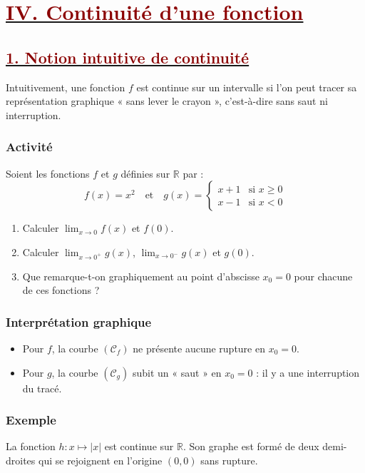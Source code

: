 \documentclass[12pt,a4paper]{article}
\begin{document}
\section*{\underline{\textcolor{darkred}{ IV. Continuité d'une fonction }}}
\subsection*{\underline{\textcolor{darkred}{ 1. Notion intuitive de continuité }}}

Intuitivement, une fonction $f$ est continue sur un intervalle si l'on peut tracer sa représentation graphique « sans lever le crayon », c'est-à-dire sans saut ni interruption.

\subsubsection*{Activité}
Soient les fonctions $f$ et $g$ définies sur $\mathbb{R}$ par :
\[
f(x) = x^2 \quad \text{et} \quad g(x) = \begin{cases} x + 1 & \text{si } x \ge 0 \\ x - 1 & \text{si } x < 0 \end{cases}
\]
\begin{enumerate}[label=\arabic*.]
    \item Calculer $\displaystyle\lim_{x \to 0} f(x)$ et $f(0)$.
    \item Calculer $\displaystyle\lim_{x \to 0^+} g(x)$, $\displaystyle\lim_{x \to 0^-} g(x)$ et $g(0)$.
    \item Que remarque-t-on graphiquement au point d'abscisse $x_0 = 0$ pour chacune de ces fonctions ?
\end{enumerate}

\subsubsection*{Interprétation graphique}
\begin{itemize}
    \item Pour $f$, la courbe $(\mathcal{C}_f)$ ne présente aucune rupture en $x_0 = 0$.
    \item Pour $g$, la courbe $(\mathcal{C}_g)$ subit un « saut » en $x_0 = 0$ : il y a une interruption du tracé.
\end{itemize}

\subsubsection*{Exemple}
La fonction $h : x \mapsto |x|$ est continue sur $\mathbb{R}$. Son graphe est formé de deux demi-droites qui se rejoignent en l'origine $(0,0)$ sans rupture.
\end{document}
